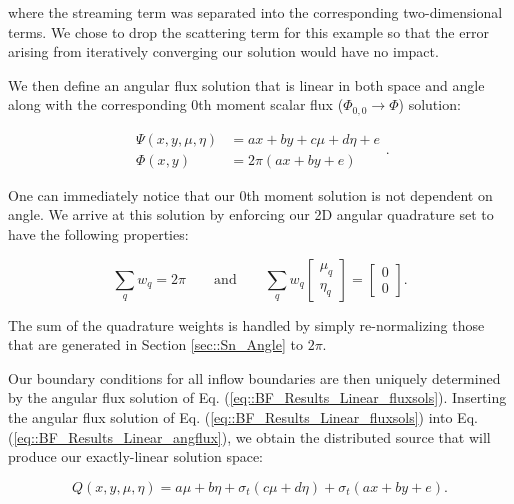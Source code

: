 \noindent where the streaming term was separated into the corresponding two-dimensional terms. We chose to drop the scattering term for this example so that the error arising from iteratively converging our solution would have no impact.

We then define an angular flux solution that is linear in both space and angle along with the corresponding 0th moment scalar flux ($\Phi_{0,0} \rightarrow \Phi$) solution:

\begin{equation}
\label{eq::BF_Results_Linear_fluxsols}
\begin{aligned}
\Psi (x,y,\mu,\eta) &= ax + by + c \mu + d\eta + e\\
\Phi (x,y) &= 2 \pi \left( ax + by  + e \right)
\end{aligned} .
\end{equation}

\noindent One can immediately notice that our 0th moment solution is not dependent on angle. We arrive at this solution by enforcing our 2D angular quadrature set to have the following properties:

\begin{equation}
\label{eq::BF_Results_Linear_quadrules}
\sum_{q} w_q = 2 \pi \qquad \text{and} \qquad \sum_{q} w_q  \left[
	\begin{array}{c}
		\mu_q \\
		\eta_q
	\end{array} \right] = \left[
	\begin{array}{c}
		0 \\
		0
	\end{array} \right] .
\end{equation}

\noindent The sum of the quadrature weights is handled by simply re-normalizing those that are generated in Section \ref{sec::Sn_Angle} to $2 \pi$.

Our boundary conditions for all inflow boundaries are then uniquely determined by the angular flux solution of Eq. (\ref{eq::BF_Results_Linear_fluxsols}). Inserting the angular flux solution of Eq. (\ref{eq::BF_Results_Linear_fluxsols}) into Eq. (\ref{eq::BF_Results_Linear_angflux}), we obtain the distributed source that will produce our exactly-linear solution space:

\begin{equation}
\label{eq::BF_Results_Linear_src}
Q(x,y,\mu,\eta) = a \mu + b \eta + \sigma_t \left(  c \mu + d \eta \right) + \sigma_t \left( ax +by + e   \right).
\end{equation}

